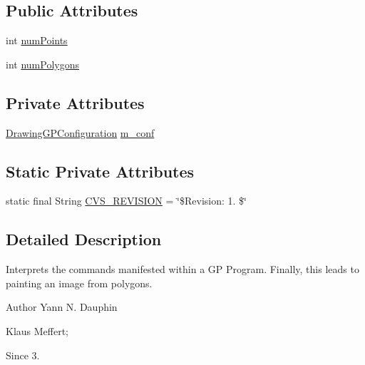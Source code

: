 \subsection*{Public Attributes}
\begin{DoxyCompactItemize}
\item 
int \hyperlink{classexamples_1_1gp_1_1monalisa_1_1core_1_1_drawing_g_p_program_runner_af9856578e2306dc0c6d37f5cf0c86040}{num\-Points}
\item 
int \hyperlink{classexamples_1_1gp_1_1monalisa_1_1core_1_1_drawing_g_p_program_runner_ae887f8429d8bfd27c586fbb8957ddaad}{num\-Polygons}
\end{DoxyCompactItemize}
\subsection*{Private Attributes}
\begin{DoxyCompactItemize}
\item 
\hyperlink{classexamples_1_1gp_1_1monalisa_1_1core_1_1_drawing_g_p_configuration}{Drawing\-G\-P\-Configuration} \hyperlink{classexamples_1_1gp_1_1monalisa_1_1core_1_1_drawing_g_p_program_runner_a62e7ecd2ebdc29cea148d9c7bc875157}{m\-\_\-conf}
\end{DoxyCompactItemize}
\subsection*{Static Private Attributes}
\begin{DoxyCompactItemize}
\item 
static final String \hyperlink{classexamples_1_1gp_1_1monalisa_1_1core_1_1_drawing_g_p_program_runner_a621ccee8fb4069192960a9cf3117dd2d}{C\-V\-S\-\_\-\-R\-E\-V\-I\-S\-I\-O\-N} = \char`\"{}\$Revision\-: 1. \$\char`\"{}
\end{DoxyCompactItemize}


\subsection{Detailed Description}
Interprets the commands manifested within a G\-P Program. Finally, this leads to painting an image from polygons.

\begin{DoxyAuthor}{Author}
Yann N. Dauphin 

Klaus Meffert; 
\end{DoxyAuthor}
\begin{DoxySince}{Since}
3. 
\end{DoxySince}


